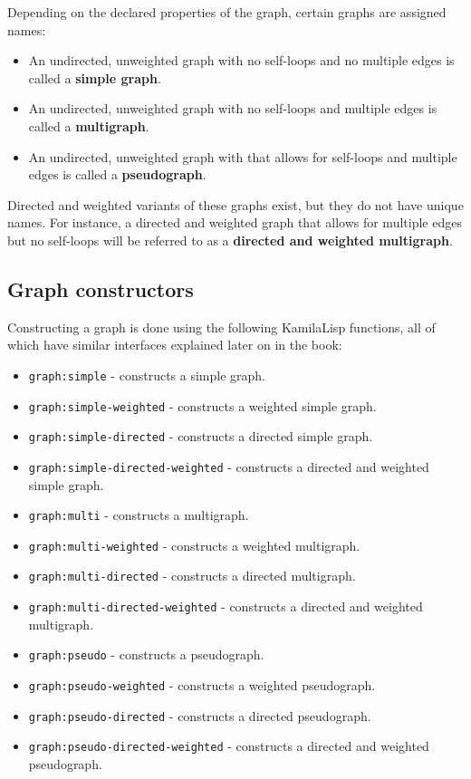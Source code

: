 Depending on the declared properties of the graph, certain graphs are assigned names:

\begin{itemize}
    \item An undirected, unweighted graph with no self-loops and no multiple edges is called a \textbf{simple graph}.
    \item An undirected, unweighted graph with no self-loops and multiple edges is called a \textbf{multigraph}.
    \item An undirected, unweighted graph with that allows for self-loops and multiple edges is called a \textbf{pseudograph}.
\end{itemize}

Directed and weighted variants of these graphs exist, but they do not have unique names. For instance, a directed and weighted graph that allows for multiple edges but no self-loops will be referred to as a \textbf{directed and weighted multigraph}.

\subsection{Graph constructors}

Constructing a graph is done using the following KamilaLisp functions, all of which have similar interfaces explained later on in the book:

\begin{itemize}
    \item \verb|graph:simple| - constructs a simple graph.
    \item \verb|graph:simple-weighted| - constructs a weighted simple graph.
    \item \verb|graph:simple-directed| - constructs a directed simple graph.
    \item \verb|graph:simple-directed-weighted| - constructs a directed and weighted simple graph.
    \item \verb|graph:multi| - constructs a multigraph.
    \item \verb|graph:multi-weighted| - constructs a weighted multigraph.
    \item \verb|graph:multi-directed| - constructs a directed multigraph.
    \item \verb|graph:multi-directed-weighted| - constructs a directed and weighted multigraph.
    \item \verb|graph:pseudo| - constructs a pseudograph.
    \item \verb|graph:pseudo-weighted| - constructs a weighted pseudograph.
    \item \verb|graph:pseudo-directed| - constructs a directed pseudograph.
    \item \verb|graph:pseudo-directed-weighted| - constructs a directed and weighted pseudograph.
\end{itemize}

